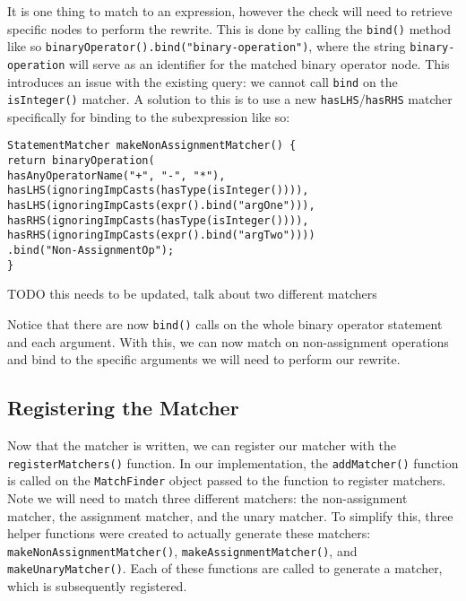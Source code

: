 It is one thing to match to an expression, however the check will need to retrieve specific nodes to perform the rewrite. This is done by calling the \texttt{bind()} method like so \texttt{binaryOperator().bind("binary-operation")}, where the string \texttt{binary-operation} will serve as an identifier for the matched binary operator node. This introduces an issue with the existing query: we cannot call \texttt{bind} on the \texttt{isInteger()} matcher. A solution to this is to use a new \texttt{hasLHS}/\texttt{hasRHS} matcher specifically for binding to the subexpression like so:
\begin{center}
\parbox{0.9\linewidth}{
\texttt{StatementMatcher makeNonAssignmentMatcher() \{\\
\hspace*{2em}return binaryOperation(\\
\hspace*{4em}hasAnyOperatorName("+", "-", "*"),\\
\hspace*{4em}hasLHS(ignoringImpCasts(hasType(isInteger()))),\\
\hspace*{4em}hasLHS(ignoringImpCasts(expr().bind("argOne"))),\\
\hspace*{4em}hasRHS(ignoringImpCasts(hasType(isInteger()))),\\
\hspace*{4em}hasRHS(ignoringImpCasts(expr().bind("argTwo"))))\\
\hspace*{2em}.bind("Non-AssignmentOp");\\
\}
}
}
\end{center}
TODO this needs to be updated, talk about two different matchers

Notice that there are now \texttt{bind()} calls on the whole binary operator statement and each argument. With this, we can now match on non-assignment operations and bind to the specific arguments we will need to perform our rewrite.

\subsection{Registering the Matcher}

Now that the matcher is written, we can register our matcher with the \texttt{registerMatchers()} function. In our implementation, the \texttt{addMatcher()} function is called on the \texttt{MatchFinder} object passed to the function to register matchers. Note we will need to match three different matchers: the non-assignment matcher, the assignment matcher, and the unary matcher. To simplify this, three helper functions were created to actually generate these matchers: \texttt{makeNonAssignmentMatcher()}, \texttt{makeAssignmentMatcher()}, and \texttt{makeUnaryMatcher()}. Each of these functions are called to generate a matcher, which is subsequently registered.

